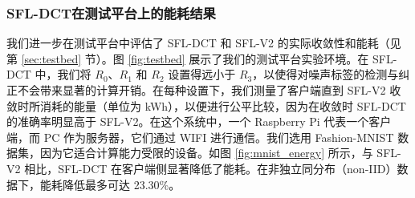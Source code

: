 \subsubsection{SFL-DCT在测试平台上的能耗结果}



我们进一步在测试平台中评估了 SFL-DCT 和 SFL-V2 的实际收敛性和能耗（见第 \ref{sec:testbed} 节）。图 \ref{fig:testbed} 展示了我们的测试平台实验环境。在 SFL-DCT 中，我们将 $R_0$、$R_1$ 和 $R_2$ 设置得远小于 $R_3$，以使得对噪声标签的检测与纠正不会带来显著的计算开销。在每种设置下，我们测量了客户端直到 SFL-V2 收敛时所消耗的能量（单位为 kWh），以便进行公平比较，因为在收敛时 SFL-DCT 的准确率明显高于 SFL-V2。在这个系统中，一个 Raspberry Pi 代表一个客户端，而 PC 作为服务器，它们通过 WIFI 进行通信。我们选用 Fashion-MNIST 数据集，因为它适合计算能力受限的设备。如图 \ref{fig:mnist_energy} 所示，与 SFL-V2 相比，SFL-DCT 在客户端侧显著降低了能耗。在非独立同分布（non-IID）数据下，能耗降低最多可达 23.30\%。



